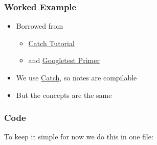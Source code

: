 \hypertarget{worked-example}{%
\subsubsection{Worked Example}\label{worked-example}}

\begin{itemize}
\tightlist
\item
  Borrowed from

  \begin{itemize}
  \tightlist
  \item
    \href{https://github.com/philsquared/Catch/blob/master/docs/tutorial.md}{Catch
    Tutorial}
  \item
    and
    \href{https://code.google.com/p/googletest/wiki/V1_7_Primer}{Googletest
    Primer}
  \end{itemize}
\item
  We use \href{https://github.com/philsquared/Catch}{Catch}, so notes
  are compilable
\item
  But the concepts are the same
\end{itemize}

\hypertarget{code}{%
\subsubsection{Code}\label{code}}

To keep it simple for now we do this in one file:

\begin{Shaded}
\begin{Highlighting}[]

  
\NormalTok{\}}

\NormalTok{, }\NormalTok{ ) \{}
\NormalTok{) == }\NormalTok{ );}
\NormalTok{) == }\NormalTok{ );}
\NormalTok{) == }\NormalTok{ );}
\NormalTok{) == }\NormalTok{ );}
\NormalTok{\}}
\end{Highlighting}
\end{Shaded}

